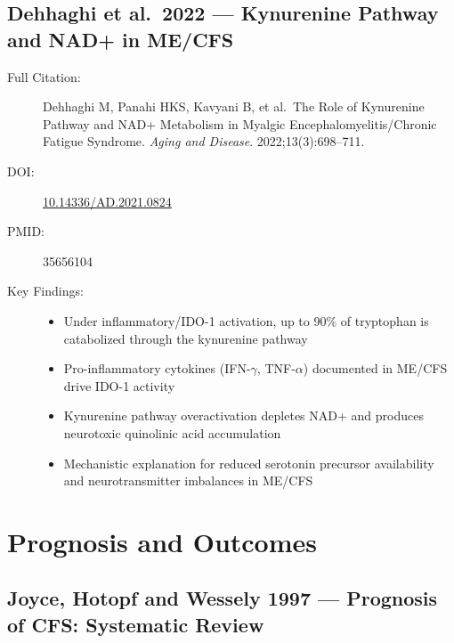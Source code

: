 \subsection{Dehhaghi et al.\ 2022 --- Kynurenine Pathway and NAD+ in ME/CFS}

\begin{description}
    \item[Full Citation:] Dehhaghi M, Panahi HKS, Kavyani B, et al.\ The Role of Kynurenine Pathway and NAD+ Metabolism in Myalgic Encephalomyelitis/Chronic Fatigue Syndrome. \textit{Aging and Disease}. 2022;13(3):698--711.
    \item[DOI:] \href{https://doi.org/10.14336/AD.2021.0824}{10.14336/AD.2021.0824}
    \item[PMID:] 35656104
    \item[Key Findings:]
    \begin{itemize}
        \item Under inflammatory/IDO-1 activation, up to 90\% of tryptophan is catabolized through the kynurenine pathway
        \item Pro-inflammatory cytokines (IFN-$\gamma$, TNF-$\alpha$) documented in ME/CFS drive IDO-1 activity
        \item Kynurenine pathway overactivation depletes NAD+ and produces neurotoxic quinolinic acid accumulation
        \item Mechanistic explanation for reduced serotonin precursor availability and neurotransmitter imbalances in ME/CFS
    \end{itemize}
\end{description}

\section{Prognosis and Outcomes}
\label{sec:bib-prognosis}

\subsection{Joyce, Hotopf and Wessely 1997 --- Prognosis of CFS: Systematic Review}

